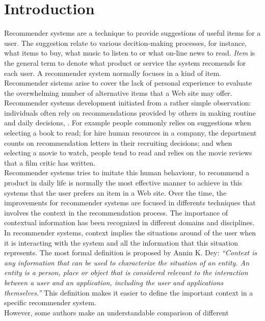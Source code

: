 \section{Introduction} \label{intro} 

Recommender systems are a technique to provide suggestions of 
useful items for a user. The suggestion relate to various
decition-making processes, for instance, what items to buy, what music
to listen to or what on-line news to read. \textit{Item} is the general
term to denote what product or service  the system recomends for each
user. A recommender system normally focuses in a kind of item.
Recommender sistems arise to cover the lack of personal experience to
evaluate the overwhelming number of alternative items that a Web site
may offer\cite{resnick1997recommender}.
Recommender systems development initiated from a rather simple
observation: individuals often rely on recommendations provided by
others in making routine and daily decisions\cite{mahmood2009improving},
\cite{mcsherry2009differentially}. 
For example people commonly relies on suggestions when selecting a
book to read; for hire human resources in a company, the department
counts on recommendation letters in their recruiting decisions; and
when selecting a movie to watch, people tend to read and relies on the
movie reviews that a film critic has written.\\
Recommender systems tries to imitate this human behaviour, to
recommend a product in daily life is normally the most effective
manner to achieve in this systems that the user prefers an item in a
Web site. Over the time, the improvements for recommender systems are
focused in differents techniques that involves the context in the
recommendation process.  The importance of contextual information has
been recognized in different domains and disciplines. In recommender
systems, context implies the situations around of the user when it is
interacting with the system and all the information that this
situation represents.
The most formal definition is proposed by Annin K.
Dey\cite{dey2001understanding}: \textit{``Context is any information
that can be used to characterize the situation of an entity. An entity
is a person, place or object that is considered relevant to the
interaction between a user and an application, including the user and
applications themselves.''} This definition makes it easier to define
the important context in a specific recommender system.\\ 
However, some authors make an understandable comparison of different 
